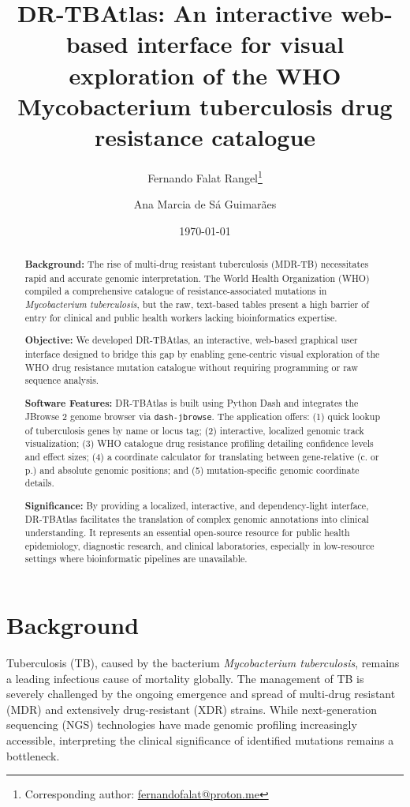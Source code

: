 \documentclass{article}
\title{DR-TBAtlas: An interactive web-based interface for visual exploration of the WHO Mycobacterium tuberculosis drug resistance catalogue}
\author{Fernando Falat Rangel\thanks{Corresponding author: \href{mailto:fernandofalat@proton.me}{fernandofalat@proton.me}} \and Ana Marcia de S\'a Guimar\~aes}
\date{\today}
\begin{document}
\maketitle

\begin{abstract}
\noindent\textbf{Background:} The rise of multi-drug resistant tuberculosis (MDR-TB) necessitates rapid and accurate genomic interpretation. The World Health Organization (WHO) compiled a comprehensive catalogue of resistance-associated mutations in \textit{Mycobacterium tuberculosis}, but the raw, text-based tables present a high barrier of entry for clinical and public health workers lacking bioinformatics expertise.

\medskip
\noindent\textbf{Objective:} We developed DR-TBAtlas, an interactive, web-based graphical user interface designed to bridge this gap by enabling gene-centric visual exploration of the WHO drug resistance mutation catalogue without requiring programming or raw sequence analysis.

\medskip
\noindent\textbf{Software Features:} DR-TBAtlas is built using Python Dash and integrates the JBrowse 2 genome browser via \texttt{dash-jbrowse}. The application offers: (1) quick lookup of tuberculosis genes by name or locus tag; (2) interactive, localized genomic track visualization; (3) WHO catalogue drug resistance profiling detailing confidence levels and effect sizes; (4) a coordinate calculator for translating between gene-relative (c. or p.) and absolute genomic positions; and (5) mutation-specific genomic coordinate details.

\medskip
\noindent\textbf{Significance:} By providing a localized, interactive, and dependency-light interface, DR-TBAtlas facilitates the translation of complex genomic annotations into clinical understanding. It represents an essential open-source resource for public health epidemiology, diagnostic research, and clinical laboratories, especially in low-resource settings where bioinformatic pipelines are unavailable.
\end{abstract}

\clearpage

\section{Background}
Tuberculosis (TB), caused by the bacterium \textit{Mycobacterium tuberculosis}, remains a leading infectious cause of mortality globally. The management of TB is severely challenged by the ongoing emergence and spread of multi-drug resistant (MDR) and extensively drug-resistant (XDR) strains. While next-generation sequencing (NGS) technologies have made genomic profiling increasingly accessible, interpreting the clinical significance of identified mutations remains a bottleneck.
\end{document}
